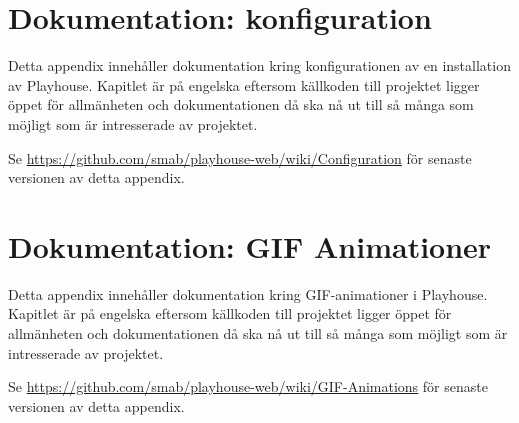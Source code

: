 \documentclass[a4paper,11pt]{article}
\begin{document}
\begin{appendices}




\newpage
\section{Dokumentation: konfiguration}
  Detta appendix innehåller dokumentation kring konfigurationen av en
  installation av Playhouse.  Kapitlet är på engelska eftersom källkoden till
  projektet ligger öppet för allmänheten och dokumentationen då ska nå ut till
  så många som möjligt som är intresserade av projektet.

  Se \url{https://github.com/smab/playhouse-web/wiki/Configuration} för
  senaste versionen av detta appendix.




\newpage
\section{Dokumentation: GIF Animationer}
  Detta appendix innehåller dokumentation kring GIF-animationer i Playhouse.
  Kapitlet är på engelska eftersom källkoden till projektet ligger öppet för
  allmänheten och dokumentationen då ska nå ut till så många som möjligt som
  är intresserade av projektet.

  Se \url{https://github.com/smab/playhouse-web/wiki/GIF-Animations} för
  senaste versionen av detta appendix.


\end{appendices}
\end{document}
